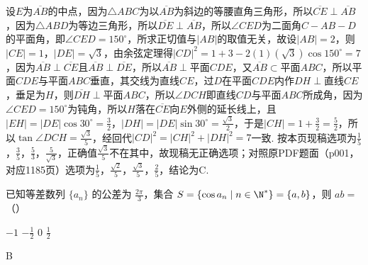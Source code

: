 \begin{solution}
设\(E\)为\(\overline{AB}\)的中点，因为\(\triangle ABC\)为以\(\overline{AB}\)为斜边的等腰直角三角形，所以\(\overline{CE}\perp\overline{AB}\)，因为\(\triangle ABD\)为等边三角形，所以\(\overline{DE}\perp\overline{AB}\)，所以\(\angle CED\)为二面角\(C-AB-D\)的平面角，即\(\angle CED=150^\circ\)，所求正切值与\(\left\lvert AB\right\rvert\)的取值无关，故设\(\left\lvert AB\right\rvert=2\)，则\(\left\lvert CE\right\rvert=1\)，\(\left\lvert DE\right\rvert=\sqrt{3}\)，由余弦定理得\(\left\lvert CD\right\rvert^{2}=1+3-2\left(1\right)\left(\sqrt{3}\right)\cos150^\circ=7\)，因为\(\overline{AB}\perp\overline{CE}\)且\(\overline{AB}\perp\overline{DE}\)，所以\(\overline{AB}\perp\)平面\(CDE\)，又\(\overline{AB}\subset\)平面\(ABC\)，所以平面\(CDE\)与平面\(ABC\)垂直，其交线为直线\(CE\)，过\(D\)在平面\(CDE\)内作\(DH\perp\)直线\(CE\)，垂足为\(H\)，则\(\overline{DH}\perp\)平面\(ABC\)，所以\(\angle DCH\)即直线\(CD\)与平面\(ABC\)所成角，因为\(\angle CED=150^\circ\)为钝角，所以\(H\)落在\(\overline{CE}\)向\(E\)外侧的延长线上，且\(\left\lvert EH\right\rvert=\left\lvert DE\right\rvert\cos30^\circ=\frac{3}{2}\)，\(\left\lvert DH\right\rvert=\left\lvert DE\right\rvert\sin30^\circ=\frac{\sqrt{3}}{2}\)，于是\(\left\lvert CH\right\rvert=1+\frac{3}{2}=\frac{5}{2}\)，所以\(\tan\angle DCH=\frac{\sqrt{3}}{5}\)，经回代\(\left\lvert CD\right\rvert^{2}=\left\lvert CH\right\rvert^{2}+\left\lvert DH\right\rvert^{2}=7\)一致. 按本页现稿选项为\(\frac{1}{5}\)，\(\frac{3}{5}\)，\(\frac{5}{3}\)，\(\frac{5}{\sqrt{3}}\)，正确值\(\frac{\sqrt{3}}{5}\)不在其中，故现稿无正确选项；对照原PDF题面（p001，对应1185页）选项为\(\frac{1}{5}\)，\(\frac{\sqrt{2}}{5}\)，\(\frac{\sqrt{3}}{5}\)，\(\frac{2}{5}\)，结论为C.
\end{solution}

\begin{problem}
已知等差数列 \(\{a_n\}\) 的公差为 \(\frac{2\pi}{3}\)，集合 \(S=\{\cos a_n\mid n\in\N^*\}=\{a,b\}\)，则 \(ab=\)（\quad）

\choices
    {\(-1\)}
    {\(-\frac12\)}
    {\(0\)}
    {\(\frac12\)}
\end{problem}

\begin{answer}
B
\end{answer}

